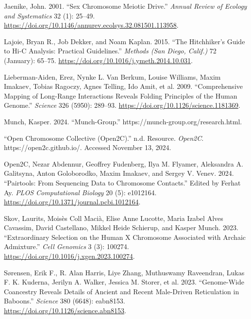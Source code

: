 \documentclass[
  11pt,
  a4paper,
]{scrbook}
\newlength{\cslhangindent}
\newenvironment{CSLReferences}[2] %
 {\begin{list}{}{%
  \setlength{\itemindent}{0pt}
  \setlength{\leftmargin}{0pt}
  \setlength{\parsep}{0pt}
  \ifodd #1
   \setlength{\leftmargin}{\cslhangindent}
   \setlength{\itemindent}{-1\cslhangindent}
  \fi
  \setlength{\itemsep}{#2\baselineskip}}}
 {\end{list}}
\let\oldemph\emph
\renewcommand\emph[1]{\oldemph{\color{gray}#1}}
\begin{document}
\begin{CSLReferences}{1}{0}
Jaenike, John. 2001. {``Sex {Chromosome Meiotic Drive}.''} \emph{Annual
Review of Ecology and Systematics} 32 (1): 25--49.
\url{https://doi.org/10.1146/annurev.ecolsys.32.081501.113958}.

Lajoie, Bryan R., Job Dekker, and Noam Kaplan. 2015. {``The
{Hitchhiker}'s {Guide} to {Hi-C Analysis}: {Practical} Guidelines.''}
\emph{Methods (San Diego, Calif.)} 72 (January): 65--75.
\url{https://doi.org/10.1016/j.ymeth.2014.10.031}.

Lieberman-Aiden, Erez, Nynke L. Van Berkum, Louise Williams, Maxim
Imakaev, Tobias Ragoczy, Agnes Telling, Ido Amit, et al. 2009.
{``Comprehensive {Mapping} of {Long-Range Interactions Reveals Folding
Principles} of the {Human Genome}.''} \emph{Science} 326 (5950):
289--93. \url{https://doi.org/10.1126/science.1181369}.

Munch, Kasper. 2024. {``Munch-Group.''}
https://munch-group.org/research.html.

{``Open {Chromosome Collective} ({Open2C}).''} n.d. Resource.
\emph{Open2C}. https://open2c.github.io/. Accessed November 13, 2024.

Open2C, Nezar Abdennur, Geoffrey Fudenberg, Ilya M. Flyamer, Aleksandra
A. Galitsyna, Anton Goloborodko, Maxim Imakaev, and Sergey V. Venev.
2024. {``Pairtools: {From} Sequencing Data to Chromosome Contacts.''}
Edited by Ferhat Ay. \emph{PLOS Computational Biology} 20 (5): e1012164.
\url{https://doi.org/10.1371/journal.pcbi.1012164}.

Skov, Laurits, Moisès Coll Macià, Elise Anne Lucotte, Maria Izabel Alves
Cavassim, David Castellano, Mikkel Heide Schierup, and Kasper Munch.
2023. {``Extraordinary Selection on the Human {X} Chromosome Associated
with Archaic Admixture.''} \emph{Cell Genomics} 3 (3): 100274.
\url{https://doi.org/10.1016/j.xgen.2023.100274}.

Sørensen, Erik F., R. Alan Harris, Liye Zhang, Muthuswamy Raveendran,
Lukas F. K. Kuderna, Jerilyn A. Walker, Jessica M. Storer, et al. 2023.
{``Genome-Wide Coancestry Reveals Details of Ancient and Recent
Male-Driven Reticulation in Baboons.''} \emph{Science} 380 (6648):
eabn8153. \url{https://doi.org/10.1126/science.abn8153}.


\end{CSLReferences}
\end{document}
